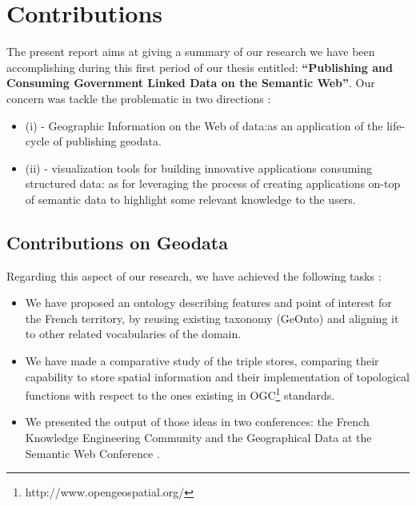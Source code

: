 \documentclass[a4paper,11pt]{report}
\begin{document}

\section{Contributions}
The present report aims at giving a summary of our research we have been accomplishing
during this first period of our thesis entitled: \textbf{``Publishing and Consuming Government Linked Data on the Semantic Web''}. Our concern was tackle the problematic in two directions : 
\begin{itemize}
\item (i) - Geographic Information on the Web of data:as an application of the life-cycle of publishing geodata.
\item (ii) - visualization tools for building innovative applications consuming structured data: as for leveraging the process of creating applications on-top of semantic data to highlight some relevant knowledge to the users.

\end{itemize}

\subsection{Contributions on Geodata}
Regarding this aspect of our research, we have achieved the following tasks :
 \begin{itemize}
  \item We have proposed an ontology describing features and point of interest for the French territory, by reusing existing taxonomy (GeOnto) and aligning it to other related vocabularies of the domain.
 \item We have made a comparative study of the triple stores, comparing their capability to store spatial information and their implementation of topological functions with respect to the ones 
existing in OGC\footnote{http://www.opengeospatial.org/} standards.
 \item We presented the output of those ideas in two conferences: the French Knowledge Engineering Community \cite{atemezing2012a} and the Geographical Data at the Semantic Web Conference \cite{atemezing2012b}.

\end{itemize}
\end{document}
